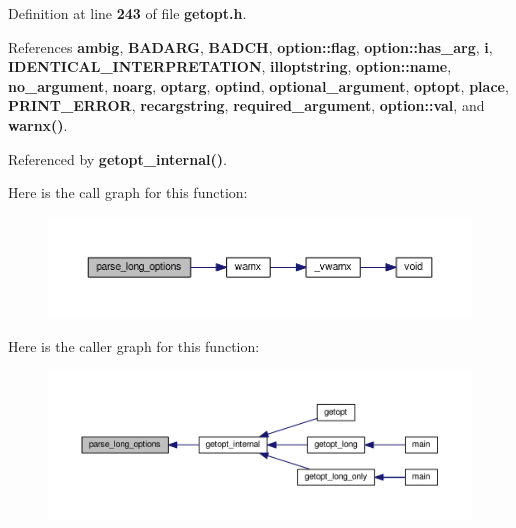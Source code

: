 Definition at line {\bf 243} of file {\bf getopt.\+h}.



References {\bf ambig}, {\bf B\+A\+D\+A\+RG}, {\bf B\+A\+D\+CH}, {\bf option\+::flag}, {\bf option\+::has\+\_\+arg}, {\bf i}, {\bf I\+D\+E\+N\+T\+I\+C\+A\+L\+\_\+\+I\+N\+T\+E\+R\+P\+R\+E\+T\+A\+T\+I\+ON}, {\bf illoptstring}, {\bf option\+::name}, {\bf no\+\_\+argument}, {\bf noarg}, {\bf optarg}, {\bf optind}, {\bf optional\+\_\+argument}, {\bf optopt}, {\bf place}, {\bf P\+R\+I\+N\+T\+\_\+\+E\+R\+R\+OR}, {\bf recargstring}, {\bf required\+\_\+argument}, {\bf option\+::val}, and {\bf warnx()}.



Referenced by {\bf getopt\+\_\+internal()}.



Here is the call graph for this function\+:
\nopagebreak
\begin{figure}[H]
\begin{center}
\leavevmode
\includegraphics[width=350pt]{d5/ded/limesuite-dev_2external_2msvc_2getopt_8h_ad438c4fc1ef360289d6d94c526350074_cgraph}
\end{center}
\end{figure}




Here is the caller graph for this function\+:
\nopagebreak
\begin{figure}[H]
\begin{center}
\leavevmode
\includegraphics[width=350pt]{d5/ded/limesuite-dev_2external_2msvc_2getopt_8h_ad438c4fc1ef360289d6d94c526350074_icgraph}
\end{center}
\end{figure}


